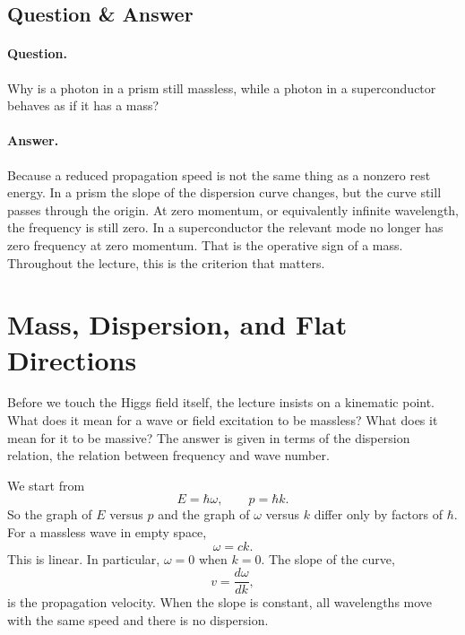 \subsection{Question \& Answer}

\paragraph{Question.} Why is a photon in a prism still massless, while a photon in a superconductor behaves as if it has a mass?

\paragraph{Answer.} Because a reduced propagation speed is not the same thing as a nonzero rest energy. In a prism the slope of the dispersion curve changes, but the curve still passes through the origin. At zero momentum, or equivalently infinite wavelength, the frequency is still zero. In a superconductor the relevant mode no longer has zero frequency at zero momentum. That is the operative sign of a mass. Throughout the lecture, this is the criterion that matters.

\section{Mass, Dispersion, and Flat Directions}

Before we touch the Higgs field itself, the lecture insists on a kinematic point. What does it mean for a wave or field excitation to be massless? What does it mean for it to be massive? The answer is given in terms of the dispersion relation, the relation between frequency and wave number.

We start from
\begin{equation}
E=\hbar\omega,
\qquad
p=\hbar k.
\end{equation}
So the graph of \(E\) versus \(p\) and the graph of \(\omega\) versus \(k\) differ only by factors of \(\hbar\). For a massless wave in empty space,
\begin{equation}
\omega = ck.
\end{equation}
This is linear. In particular, \(\omega=0\) when \(k=0\). The slope of the curve,
\begin{equation}
v=\frac{d\omega}{dk},
\end{equation}
is the propagation velocity. When the slope is constant, all wavelengths move with the same speed and there is no dispersion.

